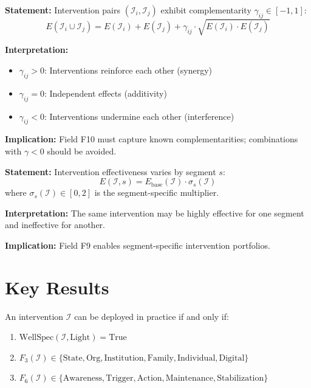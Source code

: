\begin{tcolorbox}[colback=gray!5!white, colframe=gray!75!black,
    title=Axiom HHH-A4: Complementarity Structure]
\textbf{Statement:} Intervention pairs $(\mathcal{I}_i, \mathcal{I}_j)$ exhibit complementarity $\gamma_{ij} \in [-1, 1]$:
\begin{equation}
E(\mathcal{I}_i \cup \mathcal{I}_j) = E(\mathcal{I}_i) + E(\mathcal{I}_j) + \gamma_{ij} \cdot \sqrt{E(\mathcal{I}_i) \cdot E(\mathcal{I}_j)}
\end{equation}

\textbf{Interpretation:}
\begin{itemize}[nosep]
\item $\gamma_{ij} > 0$: Interventions reinforce each other (synergy)
\item $\gamma_{ij} = 0$: Independent effects (additivity)
\item $\gamma_{ij} < 0$: Interventions undermine each other (interference)
\end{itemize}

\textbf{Implication:} Field F10 must capture known complementarities; combinations with $\gamma < 0$ should be avoided.
\end{tcolorbox}

\begin{tcolorbox}[colback=gray!5!white, colframe=gray!75!black,
    title=Axiom HHH-A5: Segment Specificity]
\textbf{Statement:} Intervention effectiveness varies by segment $s$:
\begin{equation}
E(\mathcal{I}, s) = E_{\text{base}}(\mathcal{I}) \cdot \sigma_s(\mathcal{I})
\end{equation}
where $\sigma_s(\mathcal{I}) \in [0, 2]$ is the segment-specific multiplier.

\textbf{Interpretation:} The same intervention may be highly effective for one segment and ineffective for another.

\textbf{Implication:} Field F9 enables segment-specific intervention portfolios.
\end{tcolorbox}


\section{Key Results}
\label{sec:hhh-results}

\begin{proposition}
An intervention $\mathcal{I}$ can be deployed in practice if and only if:
\begin{enumerate}
\item $\text{WellSpec}(\mathcal{I}, \text{Light}) = \text{True}$
\item $F_3(\mathcal{I}) \in \{\text{State}, \text{Org}, \text{Institution}, \text{Family}, \text{Individual}, \text{Digital}\}$
\item $F_6(\mathcal{I}) \in \{\text{Awareness}, \text{Trigger}, \text{Action}, \text{Maintenance}, \text{Stabilization}\}$
\end{enumerate}
\end{proposition}

